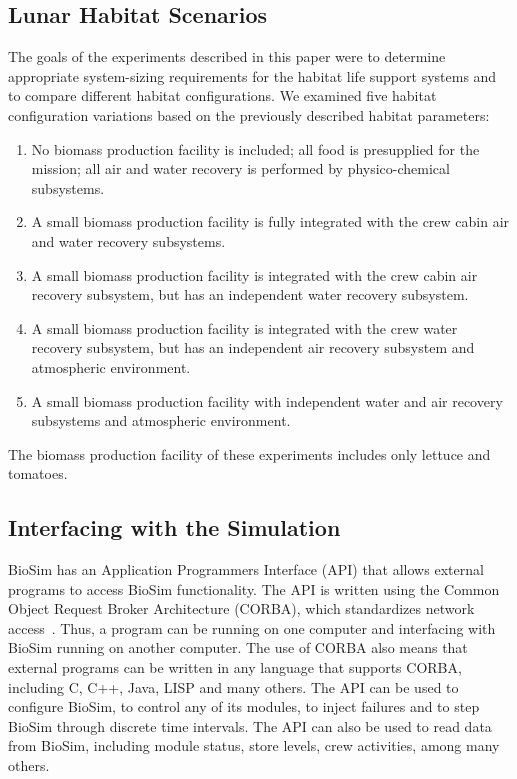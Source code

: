 \documentclass[submit]{aiaa}
\begin{document}
\subsection{Lunar Habitat Scenarios}
\label{sec:scenarios}

The goals of the experiments described in this paper were to determine
appropriate system-sizing requirements for the habitat life support
systems and to compare different habitat configurations.   
We examined five  habitat configuration variations based on the previously
described habitat parameters: 

\begin{enumerate}
	\item No biomass production facility is included; all
	food is presupplied for the mission; all air and water
	recovery is performed by physico-chemical subsystems.

	\item A small biomass production facility is fully  integrated
	with the crew cabin air and water recovery subsystems.

	\item A small biomass production facility is  integrated with
	the crew cabin air recovery subsystem, but has an independent
	water recovery subsystem. 

	\item A small biomass production facility is integrated with
	the crew water recovery subsystem, but has an independent  air
	recovery subsystem and atmospheric environment.

	\item A small biomass production facility with independent
	water and air recovery subsystems and atmospheric
	environment. 
\end{enumerate}

The biomass production facility of these experiments includes only
lettuce and tomatoes. 

\subsection{Interfacing with the Simulation}

BioSim has an Application Programmers Interface (API) that allows
external programs to access BioSim functionality.  The API is written
using the Common Object Request Broker Architecture (CORBA), which
standardizes network access~\cite{corba}.  Thus, a
program can be running on one computer and interfacing with BioSim
running on another computer.  The use of CORBA also means that
external programs can be written in any language that supports CORBA,
including C, C++, Java, LISP and many others.  The API can be used to
configure BioSim, to control any of its modules, to inject failures
and to step BioSim through discrete time intervals.  The API can also
be used to read data from BioSim, including module status, store
levels, crew activities, among many others. 
\end{document}
